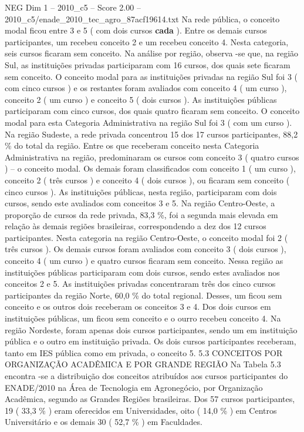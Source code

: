 \begin{textsample}{NEG Dim 1 – 2010\_c5 – Score 2.00 – 2010\_c5/enade\_2010\_tec\_agro\_87acf19614.txt}
Na rede pública, o conceito modal ficou entre 3 e 5 ( com dois cursos \textbf{cada} ).
Entre os demais cursos participantes, um recebeu conceito 2 e um recebeu conceito 4.
Nesta categoria, seis cursos ficaram sem conceito.
Na análise por região, observa -se que, na região Sul, as instituições privadas participaram com 16 cursos, dos quais sete ficaram sem conceito.
O conceito modal para as instituições privadas na região Sul foi 3 ( com cinco cursos ) e os restantes foram avaliados com conceito 4 ( um curso ), conceito 2 ( um curso ) e conceito 5 ( dois cursos ).
As instituições públicas participaram com cinco cursos, dos quais quatro ficaram sem conceito.
O conceito modal para esta Categoria Administrativa na região Sul foi 3 ( com um curso ).
Na região Sudeste, a rede privada concentrou 15 dos 17 cursos participantes, 88,2 \% do total da região.
Entre os que receberam conceito nesta Categoria Administrativa na região, predominaram os cursos com conceito 3 ( quatro cursos ) – o conceito modal.
Os demais foram classificados com conceito 1 ( um curso ), conceito 2 ( três cursos ) e conceito 4 ( dois cursos ), ou ficaram sem conceito ( cinco cursos ).
As instituições públicas, nesta região, participaram com dois cursos, sendo este avaliados com conceitos 3 e 5.
Na região Centro-Oeste, a proporção de cursos da rede privada, 83,3 \%, foi a segunda mais elevada em relação às demais regiões brasileiras, correspondendo a dez dos 12 cursos participantes.
Nesta categoria na região Centro-Oeste, o conceito modal foi 2 ( três cursos ).
Os demais cursos foram avaliados com conceito 3 ( dois cursos ), conceito 4 ( um curso ) e quatro cursos ficaram sem conceito.
Nessa região as instituições públicas participaram com dois cursos, sendo estes avaliados nos conceitos 2 e 5.
As instituições privadas concentraram três dos cinco cursos participantes da região Norte, 60,0 \% do total regional.
Desses, um ficou sem conceito e os outros dois receberam os conceitos 3 e 4.
Dos dois cursos em instituições públicas, um ficou sem conceito e o ourro recebeu conceito 4.
Na região Nordeste, foram apenas dois cursos participantes, sendo um em instituição pública e o outro em instituição privada.
Os dois cursos participantes receberam, tanto em IES pública como em privada, o conceito 5. 5.3 CONCEITOS POR ORGANIZAÇÃO ACADÊMICA E POR GRANDE REGIÃO Na Tabela 5.3 encontra -se a distribuição dos conceitos atribuídos aos cursos participantes do ENADE/2010 na Área de Tecnologia em Agronegócio, por Organização Acadêmica, segundo as Grandes Regiões brasileiras.
Dos 57 cursos participantes, 19 ( 33,3 \% ) eram oferecidos em Universidades, oito ( 14,0 \% ) em Centros Universitário e os demais 30 ( 52,7 \% ) em Faculdades.

\end{textsample}
